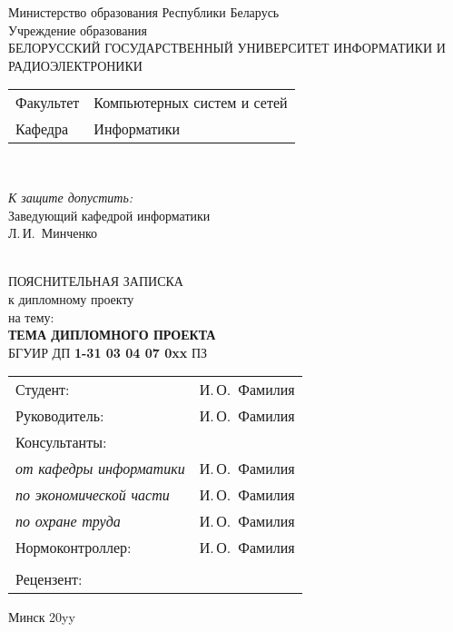 \begin{titlepage}
  \begin{center}
    Министерство образования Республики Беларусь\\[1em]
    Учреждение образования\\
    БЕЛОРУССКИЙ ГОСУДАРСТВЕННЫЙ УНИВЕРСИТЕТ ИНФОРМАТИКИ И РАДИОЭЛЕКТРОНИКИ\\[1em]

    \begin{minipage}{\textwidth}
      \begin{flushleft}
        \begin{tabular}{ l l }
          Факультет & Компьютерных систем и сетей\\
          Кафедра   & Информатики
        \end{tabular}
      \end{flushleft}
    \end{minipage}\\[1em]

    \begin{minipage}{\textwidth}
      \begin{flushright}
        \textit{К защите допустить:}\\
        Заведующий кафедрой информатики\\
        \underline{\hspace*{4.5cm}} Л.\,И.~Минченко
      \end{flushright}
    \end{minipage}\\[3em]

    {ПОЯСНИТЕЛЬНАЯ ЗАПИСКА}\\
    {к дипломному проекту}\\
    {на тему:}\\[1em]
    \textbf{\large ТЕМА ДИПЛОМНОГО ПРОЕКТА}\\[1em]


    {БГУИР ДП \textbf{1-31 03 04 07 0xx} ПЗ}\\[2em]
    
    \begin{tabular}{ p{}p{} }
      Студент: & И.\,О.~Фамилия \\
      Руководитель: & И.\,О.~Фамилия \\
      Консультанты: &\\
      \hspace*{3ex}\emph{от кафедры информатики} & И.\,О.~Фамилия \\
      \hspace*{3ex}\emph{по экономической части} & И.\,О.~Фамилия \\
      \hspace*{3ex}\emph{по охране труда} & И.\,О.~Фамилия \\
      Нормоконтроллер: & И.\,О.~Фамилия \\
      & \\
      Рецензент: &
    \end{tabular}
    
    \vfill
    {\normalsize Минск 20yy}
  \end{center}
\end{titlepage}
